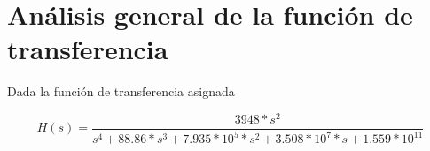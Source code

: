 \documentclass[11pt,a4paper]{report}
\author{Marcos}
\begin{document}
\section*{Análisis general de la función de transferencia}

Dada la función de transferencia asignada

\[H(s)=\frac{3948*s^2}{s^4+88.86*s^3+7.935*10^5*s^2+3.508*10^7*s+1.559*10^{11}}\]
\end{document}
